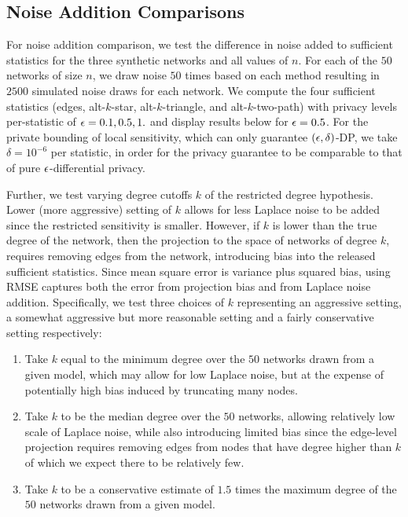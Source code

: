  \subsection{Noise Addition Comparisons}
 
 For noise addition comparison, we test the difference in noise added to sufficient statistics for the three synthetic networks and all values of $n$. For each of the $50$ networks of size $n$, we draw noise $50$ times based on each method resulting in $2500$ simulated noise draws for each network. We compute the four sufficient statistics (edges, alt-$k$-star, alt-$k$-triangle, and alt-$k$-two-path) with privacy levels per-statistic of $\epsilon = 0.1, 0.5, 1.$ and display results below for $\epsilon = 0.5$. For the private bounding of local sensitivity, which can only guarantee $(\epsilon, \delta)$-DP, we take $\delta = 10^{-6}$ per statistic, in order for the privacy guarantee to be comparable to that of pure $\epsilon$-differential privacy. 
 
 Further, we test varying degree cutoffs $k$ of the restricted degree hypothesis. Lower (more aggressive) setting of $k$ allows for less Laplace noise to be added since the restricted sensitivity is smaller. However, if $k$ is lower than the true degree of the network, then the projection to the space of networks of degree $k$, requires removing edges from the network, introducing bias into the released sufficient statistics.  Since mean square error is variance plus squared bias, using RMSE captures both the error from projection bias and from Laplace noise addition. Specifically, we test three choices of $k$ representing an aggressive setting, a somewhat aggressive but more reasonable setting and a fairly conservative setting respectively:
\begin{enumerate}
	\item Take $k$ equal to the minimum degree over the $50$ networks drawn from a given model, which may allow for low Laplace noise, but at the expense of potentially high bias induced by truncating many nodes.
	\item Take $k$ to be the median degree over the $50$ networks, allowing relatively low scale of Laplace noise, while also introducing limited bias since the edge-level projection  requires removing edges from nodes that have degree higher than $k$ of which we expect there to be relatively few.
	\item Take $k$ to be a conservative estimate of $1.5$ times the maximum degree of the $50$ networks drawn from a given model.
\end{enumerate}

